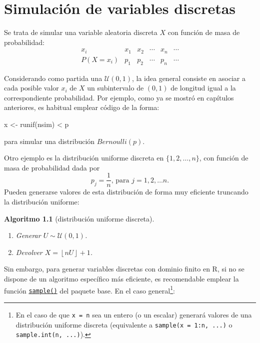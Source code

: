 \documentclass[
  10pt,
]{book}
\newenvironment{Shaded}{\begin{snugshade}}{\end{snugshade}}
\newcommand{\FunctionTok}[1]{\textcolor[rgb]{0.00,0.00,0.00}{#1}}
\newcommand{\NormalTok}[1]{#1}
\newcommand{\OtherTok}[1]{\textcolor[rgb]{0.56,0.35,0.01}{#1}}
\newcommand{\SpecialCharTok}[1]{\textcolor[rgb]{0.00,0.00,0.00}{#1}}
\theoremstyle{break}
\newtheorem{conjecture}{Algoritmo}[chapter]
\theoremstyle{nonumberplain}
\let\oldfootnote\footnote
\renewcommand\footnote[1]{\oldfootnote{\hspace{2mm}#1}}
\begin{document}
\hypertarget{discretas}{%
\chapter{Simulación de variables discretas}\label{discretas}}

Se trata de simular una variable aleatoria discreta \(X\) con función de masa de
probabilidad:
\[\begin{array}{l|ccccc}
 x_{i}  &  x_{1}  &  x_{2}  &  \cdots   &  x_{n}  &  \cdots   \\ \hline
 P\left( X=x_{i}\right)   &  p_{1}  &  p_{2}  &  \cdots   &  p_{n}  &  
\cdots  
\end{array}\]

Considerando como partida una \(\mathcal{U}\left( 0,1\right)\), la
idea general consiste en asociar a cada posible valor \(x_{i}\) de \(X\)
un subintervalo de \(\left( 0,1\right)\) de longitud igual a la correspondiente
probabilidad.
Por ejemplo, como ya se mostró en capítulos anteriores, es habitual emplear
código de la forma:

\begin{Shaded}
\begin{Highlighting}[]
\NormalTok{x }\OtherTok{\textless{}{-}} \FunctionTok{runif}\NormalTok{(nsim) }\SpecialCharTok{\textless{}}\NormalTok{ p}
\end{Highlighting}
\end{Shaded}

para simular una distribución \(Bernoulli(p)\).

Otro ejemplo es la distribución uniforme discreta
en \(\{1,2,\ldots,n\}\), con función de masa de probabilidad dada por
\[p_{j}=\frac{1}{n}\text{, para }j=1,2,\ldots n.\]
Pueden generarse valores de esta distribución de forma muy eficiente truncando la distribución uniforme:

\begin{conjecture}[distribución uniforme discreta]
\protect\hypertarget{cnj:unif-discr}{}\label{cnj:unif-discr}

\begin{enumerate}
\def\labelenumi{\arabic{enumi}.}
\item
  Generar \(U\sim \mathcal{U}\left( 0,1\right)\).
\item
  Devolver \(X=\left\lfloor nU\right\rfloor + 1\).
\end{enumerate}

\end{conjecture}

Sin embargo, para generar variables discretas con dominio finito en R, si no se dispone de un algoritmo específico más eficiente, es recomendable emplear la función \href{https://rdrr.io/r/base/sample.html}{\texttt{sample()}} del paquete base.
En el caso general\footnote{En el caso de que \texttt{x\ =\ n} sea un entero (o un escalar) generará valores de una distribución uniforme discreta (equivalente a \texttt{sample(x\ =\ 1:n,\ ...)} o \texttt{sample.int(n,\ ...)}).}:
\end{document}
